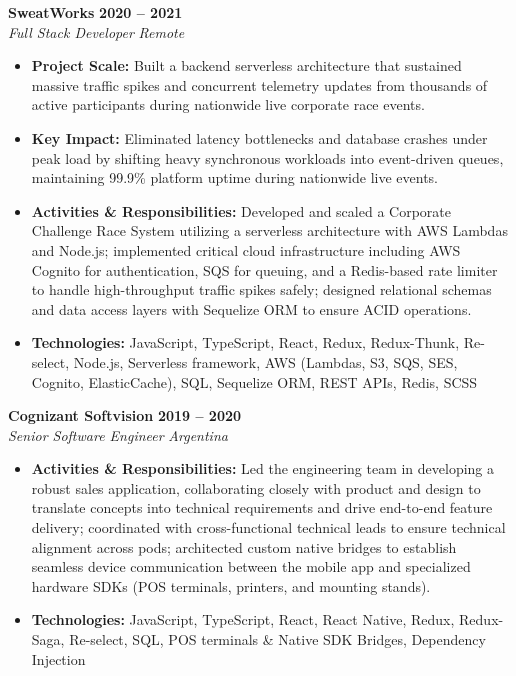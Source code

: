 \documentclass[10pt,a4paper]{article}
\begin{document}
\noindent\textbf{SweatWorks} \hfill \textbf{2020 -- 2021} \\
\textit{Full Stack Developer} \hfill \textit{Remote}
\begin{itemize}
    \item \textbf{Project Scale:} Built a backend serverless architecture that sustained massive traffic spikes and concurrent telemetry updates from thousands of active participants during nationwide live corporate race events.
    \item \textbf{Key Impact:} Eliminated latency bottlenecks and database crashes under peak load by shifting heavy synchronous workloads into event-driven queues, maintaining 99.9\% platform uptime during nationwide live events.
    \item \textbf{Activities \& Responsibilities:} Developed and scaled a Corporate Challenge Race System utilizing a serverless architecture with AWS Lambdas and Node.js; implemented critical cloud infrastructure including AWS Cognito for authentication, SQS for queuing, and a Redis-based rate limiter to handle high-throughput traffic spikes safely; designed relational schemas and data access layers with Sequelize ORM to ensure ACID operations.
    \item \textbf{Technologies:} JavaScript, TypeScript, React, Redux, Redux-Thunk, Re-select, Node.js, Serverless framework, AWS (Lambdas, S3, SQS, SES, Cognito, ElasticCache), SQL, Sequelize ORM, REST APIs, Redis, SCSS
\end{itemize}

\vspace{6pt}

\noindent\textbf{Cognizant Softvision} \hfill \textbf{2019 -- 2020} \\
\textit{Senior Software Engineer} \hfill \textit{Argentina}
\begin{itemize}
    \item \textbf{Activities \& Responsibilities:} Led the engineering team in developing a robust sales application, collaborating closely with product and design to translate concepts into technical requirements and drive end-to-end feature delivery; coordinated with cross-functional technical leads to ensure technical alignment across pods; architected custom native bridges to establish seamless device communication between the mobile app and specialized hardware SDKs (POS terminals, printers, and mounting stands).
    \item \textbf{Technologies:} JavaScript, TypeScript, React, React Native, Redux, Redux-Saga, Re-select, SQL, POS terminals \& Native SDK Bridges, Dependency Injection
\end{itemize}
\end{document}
